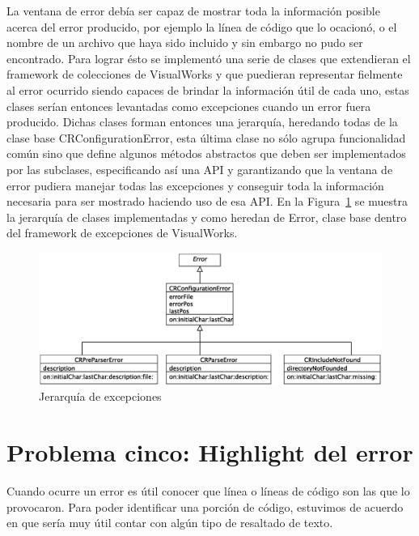 \documentclass[a4paper,oneside,12pt]{article}
\begin{document}
La ventana de error deb\'ia ser capaz de mostrar toda la informaci\'on posible acerca del error producido, por ejemplo la l\'inea de c\'odigo que lo ocacion\'o, o el nombre de un archivo que haya sido incluido y sin embargo no pudo ser encontrado. Para lograr \'esto se implement\'o una serie de clases que extendieran el framework de colecciones de VisualWorks y que puedieran representar fielmente al error ocurrido siendo capaces de brindar la informaci\'on \'util de cada uno, estas clases ser\'ian entonces levantadas como excepciones cuando un error fuera producido. Dichas clases forman entonces una jerarqu\'ia, heredando todas de la clase base CRConfigurationError, esta \'ultima clase no s\'olo agrupa funcionalidad com\'un sino que define algunos m\'etodos abstractos que deben ser implementados por las subclases, especificando as\'i una API y garantizando que la ventana de error pudiera manejar todas las excepciones y conseguir toda la informaci\'on necesaria para ser mostrado haciendo uso de esa API.
En la Figura~\ref{diagrama_clases_excepciones} se muestra la jerarqu\'ia de clases implementadas y como heredan de Error, clase base dentro del framework de excepciones de VisualWorks.

\begin{figure}[h!]
  \centering
    \includegraphics[scale=0.5]{images/diagrama_clases_excepciones.eps}
    \caption{Jerarqu\'ia de excepciones}
    \label{diagrama_clases_excepciones}
\end{figure}

\section{Problema cinco: Highlight del error}

Cuando ocurre un error es \'util conocer que l\'inea o l\'ineas de c\'odigo son las que lo provocaron. Para poder identificar una porci\'on de c\'odigo, estuvimos de acuerdo en que ser\'ia muy \'util contar con alg\'un tipo de resaltado de texto.
\end{document}
